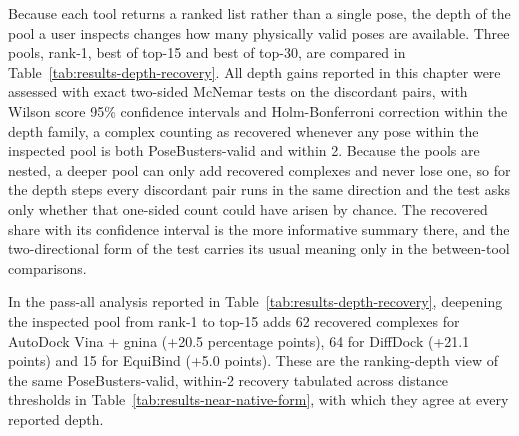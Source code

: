 Because each tool returns a ranked list rather than a single pose, the depth of the pool a user inspects changes how many physically valid poses are available. Three pools, rank-1, best of top-15 and best of top-30, are compared in Table~\ref{tab:results-depth-recovery}. All depth gains reported in this chapter were assessed with exact two-sided McNemar tests on the discordant pairs, with Wilson score 95\% confidence intervals and Holm-Bonferroni correction within the depth family, a complex counting as recovered whenever any pose within the inspected pool is both PoseBusters-valid and within 2\angstrom{}. Because the pools are nested, a deeper pool can only add recovered complexes and never lose one, so for the depth steps every discordant pair runs in the same direction and the test asks only whether that one-sided count could have arisen by chance. The recovered share with its confidence interval is the more informative summary there, and the two-directional form of the test carries its usual meaning only in the between-tool comparisons.

In the pass-all analysis reported in Table~\ref{tab:results-depth-recovery}, deepening the inspected pool from rank-1 to top-15 adds 62 recovered complexes for AutoDock Vina + gnina (+20.5 percentage points), 64 for DiffDock (+21.1 points) and 15 for EquiBind (+5.0 points). These are the ranking-depth view of the same PoseBusters-valid, within-2\angstrom{} recovery tabulated across distance thresholds in Table~\ref{tab:results-near-native-form}, with which they agree at every reported depth.

